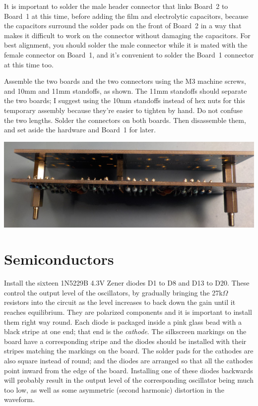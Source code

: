 It is important to solder the male header connector that links Board~2 to
Board~1 at this time, before adding the film and electrolytic capacitors,
because the capacitors surround the solder pads on the front of Board~2 in a
way that makes it difficult to work on the connector without damaging the
capacitors.  For best alignment, you should solder the male connector while
it is mated with the female connector on Board~1, and it's convenient to
solder the Board~1 connector at this time too.

Assemble the two boards and the two connectors using the M3 machine screws,
and 10mm and 11mm standoffs, as shown.  The 11mm standoffs should separate
the two boards; I suggest using the 10mm standoffs instead of hex nuts for
this temporary assembly because they're easier to tighten by hand.  Do not
confuse the two lengths.  Solder the connectors on both boards.  Then
disassemble them, and set aside the hardware and Board~1 for later.

\noindent\includegraphics[width=\linewidth]{b2b-stack.jpg}

\section{Semiconductors}

Install the sixteen 1N5229B 4.3V Zener diodes D1 to D8 and D13 to D20. 
These control the output level of the oscillators, by gradually bringing the
27k$\Omega$ resistors into the circuit as the level increases to back down
the gain until it reaches equilibrium.  They are polarized components and it
is important to install them right way round.  Each diode is packaged inside
a pink glass bead with a black stripe at one end; that end is the
\emph{cathode}.  The silkscreen markings on the board have a corresponding
stripe and the diodes should be installed with their stripes matching the
markings on the board.  The solder pads for the cathodes are also square
instead of round; and the diodes are arranged so that all the cathodes point
inward from the edge of the board.  Installing one of these diodes backwards
will probably result in the output level of the corresponding oscillator
being much too low, as well as some asymmetric (second harmonic) distortion
in the waveform.

